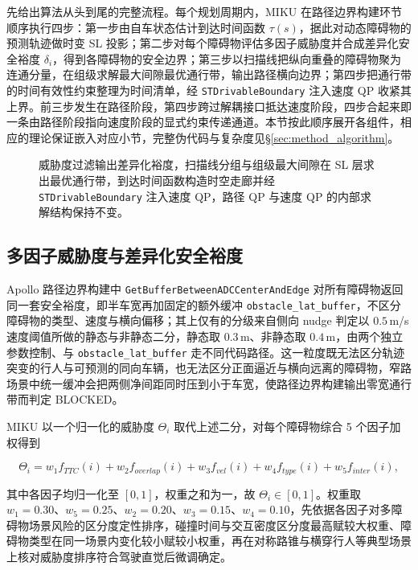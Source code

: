 \documentclass[a4paper,zihao=5]{ctexart}
\theoremstyle{definition}
\begin{document}
先给出算法从头到尾的完整流程。每个规划周期内，MIKU 在路径边界构建环节顺序执行四步：第一步由自车状态估计到达时间函数 $\tau(s)$，据此对动态障碍物的预测轨迹做时变 SL 投影；第二步对每个障碍物评估多因子威胁度并合成差异化安全裕度 $\delta_i$，得到各障碍物的安全边界；第三步以扫描线把纵向重叠的障碍物聚为连通分量，在组级求解最大间隙最优通行带，输出路径横向边界；第四步把通行带的时间有效性约束整理为时间清单，经 \texttt{STDrivableBoundary} 注入速度 QP 收紧其上界。前三步发生在路径阶段，第四步跨过解耦接口抵达速度阶段，四步合起来即一条由路径阶段指向速度阶段的显式约束传递通道。本节按此顺序展开各组件，相应的理论保证嵌入对应小节，完整伪代码与复杂度见§\ref{sec:method_algorithm}。

\begin{figure}[htbp]
\centering
{}
\caption{MIKU 显式约束传递通道的整体数据流}
\caption*{威胁度过滤输出差异化裕度，扫描线分组与组级最大间隙在 SL 层求出最优通行带，到达时间函数构造时空走廊并经 \texttt{STDrivableBoundary} 注入速度 QP，路径 QP 与速度 QP 的内部求解结构保持不变。}
\label{fig:algorithm_flow}
\end{figure}

\subsection{多因子威胁度与差异化安全裕度}
\label{sec:method_threat}

Apollo 路径边界构建中 \texttt{GetBufferBetweenADCCenterAndEdge} 对所有障碍物返回同一套安全裕度，即半车宽再加固定的额外缓冲 \texttt{obstacle\_lat\_buffer}，不区分障碍物的类型、速度与横向偏移；其上仅有的分级来自侧向 nudge 判定以 $0.5$\,m/s 速度阈值所做的静态与非静态二分，静态取 $0.3$\,m、非静态取 $0.4$\,m，由两个独立参数控制、与 \texttt{obstacle\_lat\_buffer} 走不同代码路径。这一粒度既无法区分轨迹突变的行人与可预测的同向车辆，也无法区分正面逼近与横向远离的障碍物，窄路场景中统一缓冲会把两侧净间距同时压到小于车宽，使路径边界构建输出零宽通行带而判定 BLOCKED。

MIKU 以一个归一化的威胁度 $\Theta_i$ 取代上述二分，对每个障碍物综合 5 个因子加权得到

\begin{equation}
    \Theta_i = w_1 f_{TTC}(i) + w_2 f_{overlap}(i) + w_3 f_{vel}(i) + w_4 f_{type}(i) + w_5 f_{inter}(i),
    \label{eq:threat_score}
\end{equation}

其中各因子均归一化至 $[0,1]$，权重之和为一，故 $\Theta_i \in [0,1]$。权重取 $w_1=0.30$、$w_5=0.25$、$w_2=0.20$、$w_3=0.15$、$w_4=0.10$，先依据各因子对多障碍物场景风险的区分度定性排序，碰撞时间与交互密度区分度最高赋较大权重、障碍物类型在同一场景内变化较小赋较小权重，再在对称路锥与横穿行人等典型场景上核对威胁度排序符合驾驶直觉后微调确定。
\end{document}
